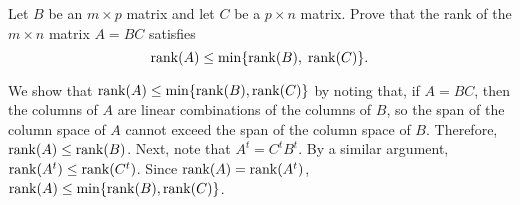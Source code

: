\documentclass{ximera}
\begin{document}
\begin{exercise} \label{c5.8.5}
Let $B$ be an $m\times p$ matrix and let $C$ be a $p\times n$
matrix. Prove that the rank of the $m\times n$ matrix $A=BC$
satisfies
\[
{\rm rank}(A) \leq \min\{{\rm rank}(B),\;{\rm rank}(C)\}.
\]

\begin{solution}

We show that ${\rm rank}(A) \leq \min\{{\rm rank}(B),{\rm rank}(C)\}$ by noting that,
if $A = BC$, then the columns of $A$ are linear combinations of the
columns of $B$, so the span of the column space of $A$ cannot exceed
the span of the column space of $B$.  Therefore, ${\rm rank}(A) \leq
{\rm rank}(B)$.  Next, note that $A^t = C^tB^t$.  By a similar argument,
${\rm rank}(A^t) \leq {\rm rank}(C^t)$.  Since ${\rm rank}(A) = {\rm rank}(A^t)$,
${\rm rank}(A) \leq \min\{{\rm rank}(B),{\rm rank}(C)\}$.

\end{solution}
\end{exercise}



\CEXER
\end{document}
